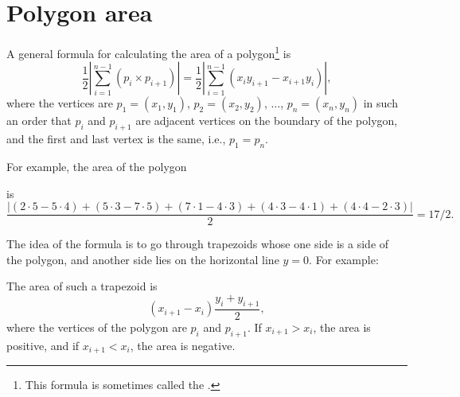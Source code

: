 \section{Polygon area}

A general formula for calculating the area
of a polygon\footnote{This formula is sometimes called the
 .} is
\[\frac{1}{2} |\sum_{i=1}^{n-1} (p_i \times p_{i+1})| =
\frac{1}{2} |\sum_{i=1}^{n-1} (x_i y_{i+1} - x_{i+1} y_i)|, \]
where the vertices are
$p_1=(x_1,y_1)$, $p_2=(x_2,y_2)$, $\ldots$, $p_n=(x_n,y_n)$
in such an order that
$p_i$ and $p_{i+1}$ are adjacent vertices on the boundary
of the polygon,
and the first and last vertex is the same, i.e., $p_1=p_n$.

For example, the area of the polygon
\begin{center}
\end{center}
is
\[\frac{|(2\cdot5-5\cdot4)+(5\cdot3-7\cdot5)+(7\cdot1-4\cdot3)+(4\cdot3-4\cdot1)+(4\cdot4-2\cdot3)|}{2} = 17/2.\]

The idea of the formula is to go through trapezoids
whose one side is a side of the polygon,
and another side lies on the horizontal line $y=0$.
For example:
\begin{center}
\end{center}
The area of such a trapezoid is
\[(x_{i+1}-x_{i}) \frac{y_i+y_{i+1}}{2},\]
where the vertices of the polygon are $p_i$ and $p_{i+1}$.
If $x_{i+1}>x_{i}$, the area is positive,
and if $x_{i+1}<x_{i}$, the area is negative.

